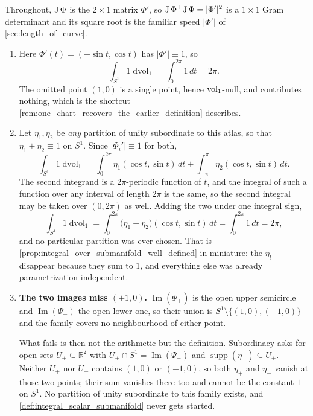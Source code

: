 \begin{exercisesolution}
\label{sol:ai_circle_two_atlases}
Throughout, $\operatorname{J}\Phi$ is the $2\times1$ matrix $\Phi'$, so
$\operatorname{J}\Phi^{\mathsf{T}}\operatorname{J}\Phi = \lvert\Phi'\rvert^2$ is a $1\times1$ Gram determinant and its square
root is the familiar speed $\lvert\Phi'\rvert$ of \cref{sec:length_of_curve}.
\begin{enumerate}[label=\textbf{(\alph*)}]
  \item Here $\Phi'(t) = (-\sin t,\cos t)$ has $\lvert\Phi'\rvert \equiv 1$, so
    \[\int_{S^1} 1 \mathop{d\text{vol}}_1 = \int_0^{2\pi} 1\,dt = 2\pi .\]
    The omitted point $(1,0)$ is a single point, hence $\operatorname{vol}_1$-null, and contributes nothing,
    which is the shortcut \cref{rem:one_chart_recovers_the_earlier_definition} describes.
  \item Let $\eta_1,\eta_2$ be \emph{any} partition of unity subordinate to this atlas, so that
    $\eta_1+\eta_2 \equiv 1$ on $S^1$. Since $\lvert\Phi_i'\rvert \equiv 1$ for both,
    \[\int_{S^1} 1 \mathop{d\text{vol}}_1
      = \int_0^{2\pi}\eta_1(\cos t,\sin t)\,dt + \int_{-\pi}^{\pi}\eta_2(\cos t,\sin t)\,dt .\]
    The second integrand is a $2\pi$-periodic function of $t$, and the integral of such a function
    over any interval of length $2\pi$ is the same, so the second integral may be taken over
    $(0,2\pi)$ as well. Adding the two under one integral sign,
    \[\int_{S^1} 1 \mathop{d\text{vol}}_1
      = \int_0^{2\pi}\big(\eta_1+\eta_2\big)(\cos t,\sin t)\,dt
      = \int_0^{2\pi} 1\,dt = 2\pi ,\]
    and no particular partition was ever chosen. That is
    \cref{prop:integral_over_submanifold_well_defined} in miniature: the $\eta_l$ disappear
    because they sum to $1$, and everything else was already parametrization-independent.
  \item \textbf{The two images miss $(\pm1,0)$.} $\operatorname{Im}(\Psi_+)$ is the open upper
    semicircle and $\operatorname{Im}(\Psi_-)$ the open lower one, so their union is
    $S^1\setminus\{(1,0),(-1,0)\}$ and the family covers no neighbourhood of either point.

    What fails is then not the arithmetic but the definition. Subordinacy asks for open sets
    $U_\pm \subseteq \mathbb{R}^2$ with $U_\pm \cap S^1 = \operatorname{Im}(\Psi_\pm)$ and
    $\operatorname{supp}(\eta_\pm) \subseteq U_\pm$. Neither $U_+$ nor $U_-$ contains $(1,0)$ or
    $(-1,0)$, so both $\eta_+$ and $\eta_-$ vanish at those two points; their sum vanishes there
    too and cannot be the constant $1$ on $S^1$. No partition of unity subordinate to this family exists, and
    \cref{def:integral_scalar_submanifold} never gets started.


\end{enumerate}
\end{exercisesolution}
